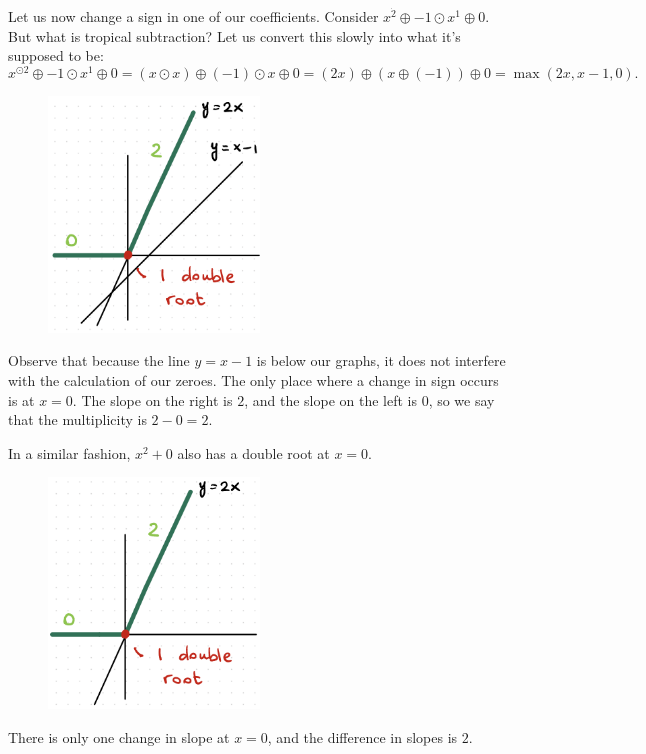 \documentclass[12pt]{memoir}
\theoremstyle{definition}
\begin{document}
\begin{Ex}
    Let us now change a sign in one of our coefficients. Consider $x^{\dot2}\oplus-1\odot x^1\oplus0$. But what is tropical subtraction? Let us convert this slowly into what it's supposed to be:
    $$x^{\odot2}\oplus-1\odot x^1\oplus0=(x\odot x)\oplus(-1)\odot x\oplus0=(2x)\oplus(x\oplus(-1))\oplus0=\max(2x,x-1,0).$$
    \begin{figure}[h!]
        \centering
        \includegraphics[width=0.5\textwidth]{figs/fig3-5DoubleRootTropicalPolynomial1.png}
        \label{fig:3.5-DoubleRoot1}
    \end{figure}

    Observe that because the line $y=x-1$ is below our graphs, it does not interfere with the calculation of our zeroes. The only place where a change in sign occurs is at $x=0$. The slope on the right is $2$, and the slope on the left is $0$, so we say that the multiplicity is $2-0=2$.
\end{Ex}


\begin{Ex}
    In a similar fashion, $x^2+0$ also has a double root at $x=0$.
    \begin{figure}[h!]
        \centering
        \includegraphics[width=0.5\textwidth]{figs/fig3-6DoubleRootTropicalPolynomial2.png}
        \label{fig:3.6-DoubleRoot6}
    \end{figure}
    
    There is only one change in slope at $x=0$, and the difference in slopes is $2$.
\end{Ex}
\end{document}
